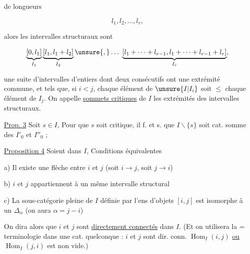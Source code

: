 de longueurs

\[l_1,l_2,\ldots,l_r,\]

alors les intervalles structuraux sont

\[\underbrace{[0,l_1]}_{I_1}\underbrace{[l_1,l_1+l_2]}_{I_2}\unsure{,}\ldots\ \underbrace{[l_1+\cdots+l_{r-1},l_1+\cdots+l_{r-1}+l_r]}_{I_r},\]

une suite d'intervalles d'entiers dont deux consécutifs ont une extrémité commune, et tels que, si $i<j$, chaque élément de $\unsure{I|I_i}$ soit $\leq$ chaque élément de $I_j$. On appelle \uline{sommets critiques} de $I$ les extrémités des intervalles structuraux.

\uline{Prop. 3} Soit $s\in I$,    Pour que $s$ soit critique, il f. et s. que $I\backslash\{s\}$ soit cat. somme des $I'_0$ et $I''_0$ ; 




 \uline{Proposition 4} Soient   dans $I$,  Conditions équivalentes

a) Il existe une flèche entre $i$ et $j$ (soit $i\to j$, soit $j\to i$)

b) $i$ et $j$ appartiennent à un même intervalle structural 

c) La sous-catégorie pleine de $I$ définie par l'ens d'objets $[i,j]$ est isomorphe à un $\mathbb{\Delta}_{\alpha}$ (on aura $\alpha=j-i$)

On dira alors que $i$ et $j$ sont \uline{directement connectés} dans $I$. (Et on utilisera la $\mathord{=}$ terminologie dans une cat. quelconque : $i$ et $j$ sont dir. conn.  $\operatorname{Hom}_I(i,j)$ \uline{ou} $\operatorname{Hom}_I(j,i)$ est non vide.)

